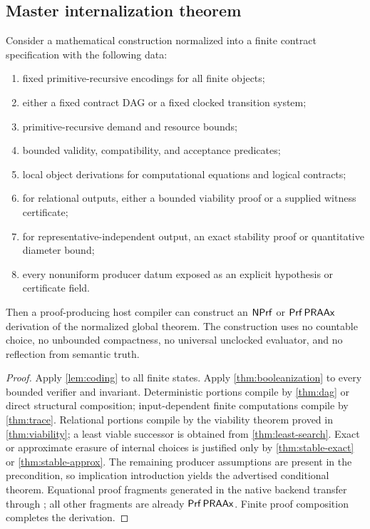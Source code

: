 \subsection{Master internalization theorem}

\begin{theorem}\label{thm:master-compiler}
Consider a mathematical construction normalized into a finite contract specification with the following data:

\begin{enumerate}
  \item fixed primitive-recursive encodings for all finite objects;
  \item either a fixed contract DAG or a fixed clocked transition system;
  \item primitive-recursive demand and resource bounds;
  \item bounded validity, compatibility, and acceptance predicates;
  \item local object derivations for computational equations and logical contracts;
  \item for relational outputs, either a bounded viability proof or a supplied witness certificate;
  \item for representative-independent output, an exact stability proof or quantitative diameter bound;
  \item every nonuniform producer datum exposed as an explicit hypothesis or certificate field.
\end{enumerate}

Then a proof-producing host compiler can construct an \(\mathsf{NPrf}\) or
\(\mathsf{Prf}\,\mathsf{PRAAx}\) derivation of the normalized global theorem.  The construction uses no countable choice, no unbounded compactness, no universal unclocked evaluator, and no reflection from semantic truth.
\end{theorem}

\begin{proof}
Apply \cref{lem:coding} to all finite states.  Apply \cref{thm:booleanization} to every bounded verifier and invariant.  Deterministic portions compile by \cref{thm:dag} or direct structural composition; input-dependent finite computations compile by \cref{thm:trace}.  Relational portions compile by the viability theorem proved in \cref{thm:viability}; a least viable successor is obtained from \cref{thm:least-search}.  Exact or approximate erasure of internal choices is justified only by \cref{thm:stable-exact} or \cref{thm:stable-approx}.  The remaining producer assumptions are present in the precondition, so implication introduction yields the advertised conditional theorem.  Equational proof fragments generated in the native backend transfer through ; all other fragments are already \(\mathsf{Prf}\,\mathsf{PRAAx}\).  Finite proof composition completes the derivation.
\end{proof}


